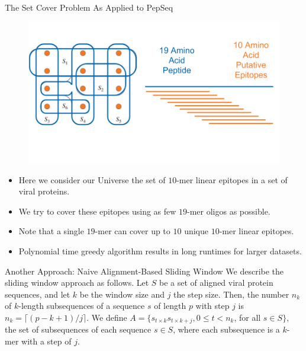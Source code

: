 \documentclass[final]{beamer}
\newlength{\colwidth}
\begin{document}
\begin{frame}[t]
\begin{columns}[t]
\begin{column}{\colwidth}
\begin{block}{The Set Cover Problem As Applied to PepSeq}
    \begin{figure}
      \includegraphics[width=0.7\colwidth]{figures/set_cover_oligo.png}
      \label{fig:library}
    \end{figure}
    \begin{itemize}
      \item Here we consider our Universe the set of $10$-mer linear epitopes in a set of viral proteins.
      \item We try to cover these epitopes using as few $19$-mer oligos as possible.
      \item Note that a single $19$-mer can cover up to $10$ unique $10$-mer linear epitopes.
      \item Polynomial time greedy algorithm results in long runtimes for larger datasets.
    \end{itemize}


\end{block}

\begin{block}{Another Approach: Naive Alignment-Based Sliding Window}
  We describe the sliding window approach as follows.
  Let $S$ be a set of aligned viral protein sequences, and let $k$ be the window size and $j$ the step size.
  Then, the number $n_k$ of $k$-length subsequences of a sequence $s$ of length $p$ with step $j$ is $n_k = \lceil(p - k + 1 )/j\rceil$.
  We define $A = \{ s_{t\times k }s_{t\times k + j}, 0 \leq t < n_k$, for all $s \in S \}$, the set of subsequences of each sequence
  $s\in S$, where each subsequence is a $k$-mer with a step of $j$.


\end{block}
\end{column}
\end{columns}
\end{frame}
\end{document}
